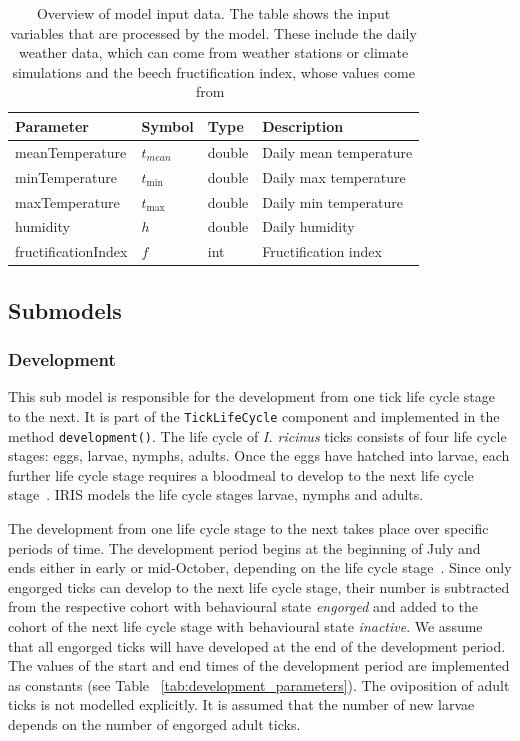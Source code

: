 \documentclass[a4paper, 11pt]{scrartcl}
\newcommand{\inlinecode}[1]{\texttt{\small #1}}
\begin{document}
\begin{table}[h!]
\caption[Overview of model input data.]{Overview of model input data. The table shows the input variables that are processed by the model. These include the daily weather data, which can come from weather stations or climate simulations and the beech fructification index, whose values come from~\textcite{Konnert.2016}}
\label{tab:input_parameters}
\begin{tabularx}{\textwidth}{llll}
\toprule
\textbf{Parameter} & \textbf{Symbol} & \textbf{Type}     & \textbf{Description}       \\
\midrule
meanTemperature    & $t_{mean}$      & double            & Daily mean temperature     \\
minTemperature     & $t_{\min}$      & double            & Daily max temperature      \\
maxTemperature     & $t_{\max}$      & double            & Daily min temperature      \\
humidity           & $h$             & double            & Daily humidity             \\
\midrule
fructificationIndex & $f$            & int               & Fructification index		  \\
\bottomrule
\end{tabularx}
\end{table}


\newpage
\subsection{Submodels}\label{submodels}

\subsubsection{Development}
This sub model is responsible for the development from one tick life cycle stage to the next. It is part of the \inlinecode{TickLifeCycle} component and implemented in the method \inlinecode{development()}. The life cycle of \textit{I. ricinus} ticks consists of four life cycle stages: eggs, larvae, nymphs, adults. Once the eggs have hatched into larvae, each further life cycle stage requires a bloodmeal to develop to the next life cycle stage~\parencite{tba}. IRIS models the life cycle stages larvae, nymphs and adults.

The development from one life cycle stage to the next takes place over specific periods of time. The development period begins at the beginning of July and ends either in early or mid-October, depending on the life cycle stage~\parencite{tba}. Since only engorged ticks can develop to the next life cycle stage, their number is subtracted from the respective cohort with behavioural state \emph{engorged} and added to the cohort of the next life cycle stage with behavioural state \emph{inactive}. We assume that all engorged ticks will have developed at the end of the development period. The values of the start and end times of the development period are implemented as constants (see Table ~\ref{tab:development_parameters}). The oviposition of adult ticks is not modelled explicitly. It is assumed that the number of new larvae depends on the number of engorged adult ticks.
\end{document}
